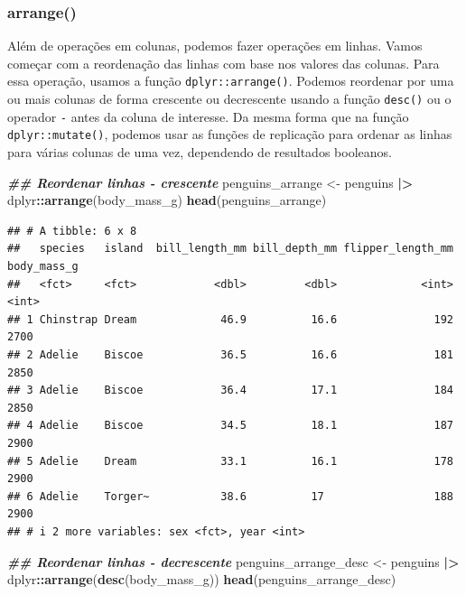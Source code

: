 \documentclass[
]{article}
\newenvironment{Shaded}{\begin{snugshade}}{\end{snugshade}}
\newcommand{\DocumentationTok}[1]{\textcolor[rgb]{0.56,0.35,0.01}{\textbf{\textit{#1}}}}
\newcommand{\FunctionTok}[1]{\textcolor[rgb]{0.13,0.29,0.53}{\textbf{#1}}}
\newcommand{\NormalTok}[1]{#1}
\newcommand{\OtherTok}[1]{\textcolor[rgb]{0.56,0.35,0.01}{#1}}
\newcommand{\SpecialCharTok}[1]{\textcolor[rgb]{0.81,0.36,0.00}{\textbf{#1}}}
\begin{document}
\hypertarget{arrange}{%
\subsubsection{arrange()}\label{arrange}}

Além de operações em colunas, podemos fazer operações em linhas. Vamos começar com a reordenação das linhas com base nos valores das colunas. Para essa operação, usamos a função \texttt{dplyr::arrange()}. Podemos reordenar por uma ou mais colunas de forma crescente ou decrescente usando a função \texttt{desc()} ou o operador \texttt{-} antes da coluna de interesse. Da mesma forma que na função \texttt{dplyr::mutate()}, podemos usar as funções de replicação para ordenar as linhas para várias colunas de uma vez, dependendo de resultados booleanos.

\begin{Shaded}
\begin{Highlighting}[]
\DocumentationTok{\#\# Reordenar linhas {-} crescente}
\NormalTok{penguins\_arrange }\OtherTok{\textless{}{-}}\NormalTok{ penguins }\SpecialCharTok{|\textgreater{}} 
\NormalTok{    dplyr}\SpecialCharTok{::}\FunctionTok{arrange}\NormalTok{(body\_mass\_g)}
\FunctionTok{head}\NormalTok{(penguins\_arrange)}
\end{Highlighting}
\end{Shaded}

\begin{verbatim}
## # A tibble: 6 x 8
##   species   island  bill_length_mm bill_depth_mm flipper_length_mm body_mass_g
##   <fct>     <fct>            <dbl>         <dbl>             <int>       <int>
## 1 Chinstrap Dream             46.9          16.6               192        2700
## 2 Adelie    Biscoe            36.5          16.6               181        2850
## 3 Adelie    Biscoe            36.4          17.1               184        2850
## 4 Adelie    Biscoe            34.5          18.1               187        2900
## 5 Adelie    Dream             33.1          16.1               178        2900
## 6 Adelie    Torger~           38.6          17                 188        2900
## # i 2 more variables: sex <fct>, year <int>
\end{verbatim}

\begin{Shaded}
\begin{Highlighting}[]
\DocumentationTok{\#\# Reordenar linhas {-} decrescente}
\NormalTok{penguins\_arrange\_desc }\OtherTok{\textless{}{-}}\NormalTok{ penguins }\SpecialCharTok{|\textgreater{}} 
\NormalTok{    dplyr}\SpecialCharTok{::}\FunctionTok{arrange}\NormalTok{(}\FunctionTok{desc}\NormalTok{(body\_mass\_g))}
\FunctionTok{head}\NormalTok{(penguins\_arrange\_desc)}
\end{Highlighting}
\end{Shaded}
\end{document}
